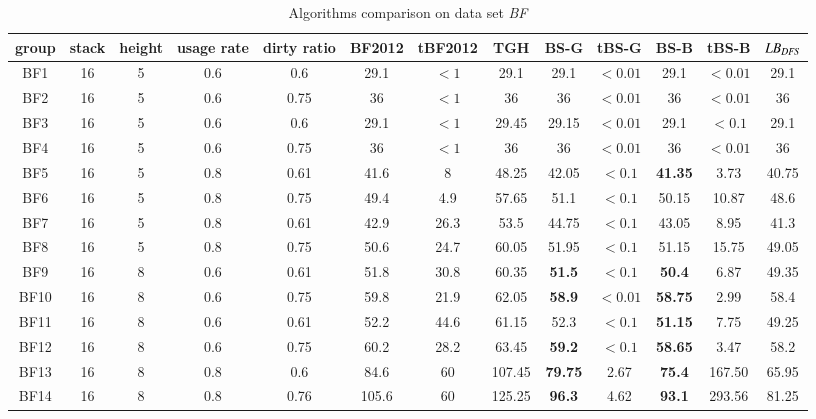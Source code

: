 \documentclass[review,3p,times,authoryear,12pt]{elsarticle}
\begin{document}
\begin{table}[htbp]
\caption{\label{tab:bf} Algorithms comparison on data set {\em BF}}
\footnotesize
\begin{tabular}{c|c|c|c|c|c|c|c|c|c|c|c|c}
  \hline
  group & stack & height & usage rate & dirty ratio & BF2012 & tBF2012 & TGH   & BS-G  & tBS-G & BS-B  & tBS-B & $\id{LB}_\id{DFS}$\\
    \hline
    BF1 & 16 & 5  & 0.6 & 0.6  & 29.1  & $<1$  & 29.1   & 29.1          & $<0.01$ & 29.1           & $<0.01$ & 29.1 \\
    BF2 & 16 & 5  & 0.6 & 0.75 & 36    & $<1$  & 36     & 36            & $<0.01$ & 36             & $<0.01$ & 36\\
    BF3 & 16 & 5  & 0.6 & 0.6  & 29.1  & $<1$  & 29.45  & 29.15         & $<0.01$ & 29.1           & $<0.1$  & 29.1\\
    BF4 & 16 & 5  & 0.6 & 0.75 & 36    & $<1$  & 36     & 36            & $<0.01$ & 36             & $<0.01$ & 36\\
    BF5 & 16 & 5  & 0.8 & 0.61 & 41.6  & 8     & 48.25  & 42.05         & $<0.1$  & \textbf{41.35} & 3.73    & 40.75\\
    BF6 & 16 & 5  & 0.8 & 0.75 & 49.4  & 4.9   & 57.65  & 51.1          & $<0.1$  & 50.15          & 10.87   & 48.6\\
    BF7 & 16 & 5  & 0.8 & 0.61 & 42.9  & 26.3  & 53.5   & 44.75         & $<0.1$  & 43.05          & 8.95    & 41.3\\
    BF8 & 16 & 5  & 0.8 & 0.75 & 50.6  & 24.7  & 60.05  & 51.95         & $<0.1$  & 51.15          & 15.75   & 49.05\\
    BF9 & 16 & 8  & 0.6 & 0.61 & 51.8  & 30.8  & 60.35  & \textbf{51.5} & $<0.1$  & \textbf{50.4}  & 6.87    & 49.35\\
    BF10& 16 & 8  & 0.6 & 0.75 & 59.8  & 21.9  & 62.05  & \textbf{58.9} & $<0.01$ & \textbf{58.75} & 2.99    & 58.4\\
    BF11& 16 & 8  & 0.6 & 0.61 & 52.2  & 44.6  & 61.15  & 52.3          & $<0.1$  & \textbf{51.15} & 7.75    & 49.25\\
    BF12& 16 & 8  & 0.6 & 0.75 & 60.2  & 28.2  & 63.45  & \textbf{59.2} & $<0.1$  & \textbf{58.65} & 3.47    & 58.2\\
    BF13& 16 & 8  & 0.8 & 0.6  & 84.6  & 60    & 107.45 & \textbf{79.75}& 2.67    & \textbf{75.4}  & 167.50  & 65.95\\
    BF14& 16 & 8  & 0.8 & 0.76 & 105.6 & 60    & 125.25 & \textbf{96.3} & 4.62    & \textbf{93.1}  & 293.56  & 81.25\\

\end{tabular}
\end{table}
\end{document}
